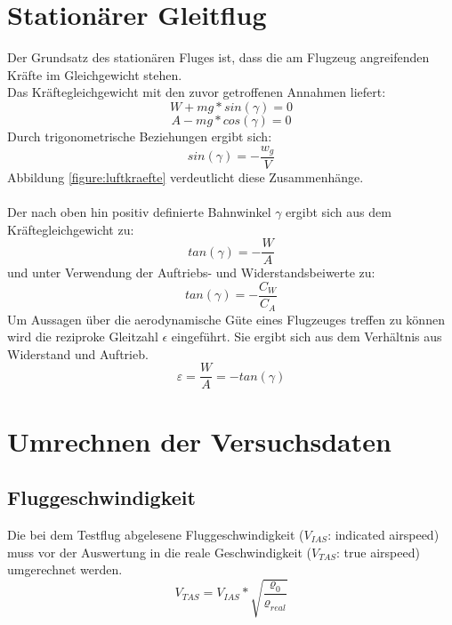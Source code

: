 \section{Stationärer Gleitflug}
Der Grundsatz des stationären Fluges ist, dass die am Flugzeug angreifenden Kräfte im Gleichgewicht stehen. \\
Das Kräftegleichgewicht mit den zuvor getroffenen Annahmen liefert:
\begin{equation}
\label{eq:kräftegleichgewichtWiderstand}
W + mg*sin(\gamma) = 0
\end{equation}
%
%
%
\begin{equation}
\label{eq:kräftegleichgewichtAuftrieb}
A - mg*cos(\gamma) = 0
\end{equation}
Durch trigonometrische Beziehungen ergibt sich:
\begin{equation}
\label{eq:bahnneigungswinkel}
sin(\gamma) = -\frac{w_g}{V}
\end{equation}
%
%
Abbildung \ref{figure:luftkraefte} verdeutlicht diese Zusammenhänge.\\ \\
Der nach oben hin positiv definierte Bahnwinkel $\gamma$ ergibt sich aus dem Kräftegleichgewicht zu:
\begin{equation}
tan(\gamma)=-\frac{W}{A}
\end{equation}
und unter Verwendung der Auftriebs- und Widerstandsbeiwerte zu:
\begin{equation}
tan(\gamma)=-\frac{C_W}{C_A}
\end{equation}
%
%
Um Aussagen über die aerodynamische Güte eines Flugzeuges treffen zu können wird die reziproke Gleitzahl $\epsilon$ eingeführt. Sie ergibt sich aus dem Verhältnis aus Widerstand und Auftrieb.
\begin{equation}
\varepsilon=\frac{W}{A}=-tan(\gamma)
\end{equation}
%

\section{Umrechnen der Versuchsdaten}
\subsection{Fluggeschwindigkeit}
Die bei dem Testflug abgelesene Fluggeschwindigkeit ($V_{IAS}$: indicated airspeed) muss vor der Auswertung in die reale Geschwindigkeit ($V_{TAS}$: true airspeed) umgerechnet werden.
\begin{equation}
V_{TAS}=V_{IAS}*\sqrt{\frac{\varrho_0}{\varrho_{real}}}
\end{equation}

\newpage